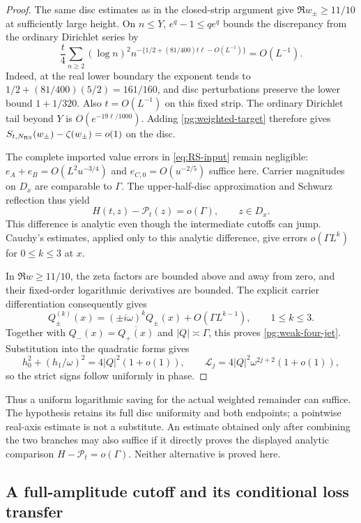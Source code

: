 \documentclass[11pt]{article}
\numberwithin{equation}{section}
\theoremstyle{definition}
\theoremstyle{remark}
\newcommand{\Lag}{\mathcal L}
\begin{document}
\begin{proof}
The same disc estimates as in the closed-strip argument give
$\Re w_\pm\ge11/10$ at sufficiently large height.  On $n\le Y$,
$e^q-1\le qe^q$ bounds the discrepancy from the ordinary Dirichlet
series by
\[
 \frac t4\sum_{n\ge2}(\log n)^2
 n^{-\{1/2+(81/400)t\ell-O(L^{-1})\}}=O(L^{-1}).
\]
Indeed, at the real lower boundary the exponent tends to
$1/2+(81/400)(5/2)=161/160$, and disc perturbations preserve
the lower bound $1+1/320$.  Also $t=O(L^{-1})$ on this fixed
strip.  The ordinary Dirichlet tail beyond $Y$ is
$O(e^{-19\ell/1000})$.  Adding \eqref{pg:weighted-target} therefore
gives $S_{t,N_{\rm RS}}(w_\pm)-\zeta(w_\pm)=o(1)$ on the disc.

The complete imported value errors in \eqref{eq:RS-input} remain
negligible: $e_A+e_B=O(L^2u^{-3/4})$ and
$e_{C,0}=O(u^{-2/5})$ suffice here.  Carrier magnitudes on $D_x$
are comparable to $\Gamma$.  The upper-half-disc approximation and
Schwarz reflection thus yield
\[
 H(t,z)-\mathcal P_t(z)=o(\Gamma),\qquad z\in D_x.
\]
This difference is analytic even though the intermediate cutoffs
can jump.  Cauchy's estimates, applied only to this analytic
difference, give errors $o(\Gamma L^k)$ for $0\le k\le3$ at $x$.

In $\Re w\ge11/10$, the zeta factors are bounded above and away
from zero, and their fixed-order logarithmic derivatives are bounded.
The explicit carrier differentiation consequently gives
\[
 Q_\pm^{(k)}(x)=(\pm i\omega)^kQ_\pm(x)
                         +O(\Gamma L^{k-1}),\qquad 1\le k\le3.
\]
Together with $Q_-(x)=\overline{Q_+(x)}$ and $|Q|\asymp\Gamma$,
this proves \eqref{pg:weak-four-jet}.  Substitution into the quadratic
forms gives
\[
 h_0^2+(h_1/\omega)^2=4|Q|^2(1+o(1)),\qquad
 \Lag_j=4|Q|^2\omega^{2j+2}(1+o(1)),
\]
so the strict signs follow uniformly in phase.
\end{proof}

Thus a uniform logarithmic saving for the actual weighted remainder
can suffice.  The hypothesis retains its full disc uniformity and
both endpoints; a pointwise real-axis estimate is not a substitute.
An estimate obtained only after combining the two branches may also
suffice if it directly proves the displayed analytic comparison
$H-\mathcal P_t=o(\Gamma)$.  Neither alternative is proved here.

\subsection{A full-amplitude cutoff and its conditional loss transfer}
\end{document}
